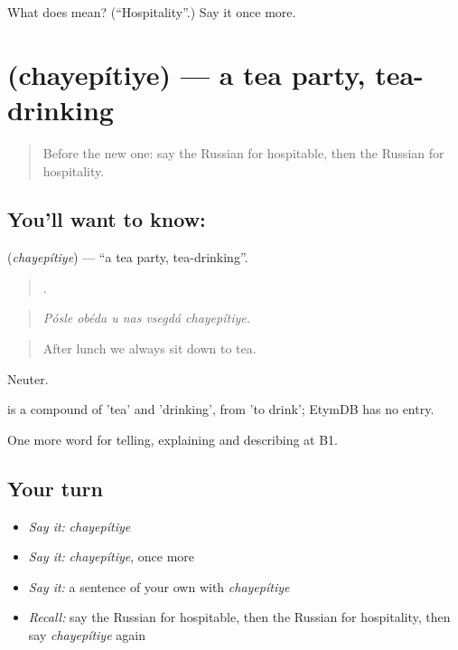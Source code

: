 \begin{tcolorbox}[breakable,colback=teal!4,colframe=teal!35!black,title={Before you move on}]
What does  mean? (\textquotedblleft{}Hospitality\textquotedblright{}.) Say it once more.
\end{tcolorbox}
\section[\texorpdfstring{\ru{чаепитие} (chayepítiye)}{чаепитие (chayepítiye)}]{ (chayepítiye) — a tea party, tea-drinking}

\label{lesson:RU-C499-chayepitiye}



\begin{quote}
Before the new one: say the Russian for hospitable, then the Russian for hospitality.
\end{quote}

\subsection*{You'll want to know: }
\textbf{} (\emph{chayepítiye}) — \textquotedblleft{}a tea party, tea-drinking\textquotedblright{}.

\begin{quote}
     .
\end{quote}

\begin{quote}
\emph{Pósle obéda u nas vsegdá chayepítiye.}
\end{quote}

\begin{quote}
After lunch we always sit down to tea.
\end{quote}

Neuter.

\begin{cousinweb}
\emph{} is a compound of \emph{} 'tea' and \emph{} 'drinking', from \emph{} 'to drink'; EtymDB has no entry.
\end{cousinweb}

\begin{grammarlens}[title={What you've built}]
One more word for telling, explaining and describing at B1.
\end{grammarlens}

\subsection*{Your turn}
\begin{itemize}
\raggedright
  \item \emph{Say it:} \emph{chayepítiye}
  \item \emph{Say it:} \emph{chayepítiye}, once more
  \item \emph{Say it:} a sentence of your own with \emph{chayepítiye}
  \item \emph{Recall:} say the Russian for hospitable, then the Russian for hospitality, then say \emph{chayepítiye} again
\end{itemize}

